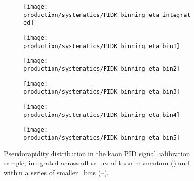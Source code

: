\begin{figure}
  \begin{subfigure}{0.5\textwidth}
    \centering
    \texttt{[image: production/systematics/PIDK\_binning\_eta\_integrated]}
    \caption{}
    \label{fig:prod:syst:pid:kde_eta:integrated}
  \end{subfigure}
  \begin{subfigure}{0.5\textwidth}
    \centering
    \texttt{[image: production/systematics/PIDK\_binning\_eta\_bin1]}
    \caption{}
    \label{fig:prod:syst:pid:kde_eta:bin1}
  \end{subfigure}
  \begin{subfigure}{0.5\textwidth}
    \centering
    \texttt{[image: production/systematics/PIDK\_binning\_eta\_bin2]}
    \caption{}
    \label{fig:prod:syst:pid:kde_eta:bin2}
  \end{subfigure}
  \begin{subfigure}{0.5\textwidth}
    \centering
    \texttt{[image: production/systematics/PIDK\_binning\_eta\_bin3]}
    \caption{}
    \label{fig:prod:syst:pid:kde_eta:bin3}
  \end{subfigure}
  \begin{subfigure}{0.5\textwidth}
    \centering
    \texttt{[image: production/systematics/PIDK\_binning\_eta\_bin4]}
    \caption{}
    \label{fig:prod:syst:pid:kde_eta:bin4}
  \end{subfigure}
  \begin{subfigure}{0.5\textwidth}
    \centering
    \texttt{[image: production/systematics/PIDK\_binning\_eta\_bin5]}
    \caption{}
    \label{fig:prod:syst:pid:kde_eta:bin5}
  \end{subfigure}
  \caption{%
    Pseudorapidity distribution in the kaon \ac{PID} signal calibration sample, 
    integrated across all values of kaon momentum 
    () and within a series of 
    smaller \ptot\ bins 
    (--).
  }
  \label{fig:prod:syst:pid:kde_eta}
\end{figure}

